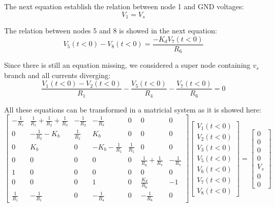 \noindent The next equation establish the relation between node 1 and GND voltages:
\begin{equation}
V_1 = V_s
  \label{eq:kvl_node1}
\end{equation}

\noindent The relation between nodes 5 and 8 is showed in the next equation:
\begin{equation}
V_5(t<0) - V_8(t<0) = \frac{-K_dV_7(t<0)}{R_6}
  \label{eq:kvl_node58}
\end{equation}

\noindent Since there is still an equation missing, we considered a super node containing $v_s$ branch and all currents diverging:
\begin{equation}
\frac{V_1(t<0) - V_2(t<0)}{R_1} - \frac{V_5(t<0)}{R_4} - \frac{V_7(t<0)}{R_6} = 0
  \label{eq:kvl_supernode}
\end{equation}

\noindent All these equations can be transformed in a matricial system as it is showed here:
$$ \left[ \begin{array}{ccccccc} -\frac{1}{R_1} & \frac{1}{R_1} + \frac{1}{R_2} + \frac{1}{R_3} & -\frac{1}{R_2} & -\frac{1}{R_3} & 0 & 0 & 0 \\
0 & -\frac{1}{R_2} - K_b & \frac{1}{R_2} & K_b & 0 & 0 & 0 \\
0 & K_b & 0 & -K_b -\frac{1}{R_5}& \frac{1}{R_5} & 0 & 0
\\ 0 & 0 & 0 & 0 & 0 & \frac{1}{R_6} + \frac{1}{R_7} & -\frac{1}{R_7}
\\ 1 & 0 & 0 & 0 & 0 & 0 & 0
\\ 0 & 0 & 0 & 1 & 0 & \frac{K_d}{R_6} & -1
\\ \frac{1}{R_1} & -\frac{1}{R_1} & 0 & -\frac{1}{R_4} & 0 & -\frac{1}{R_6} & 0\end{array} \right]
\left[ \begin{array}{c} V_1(t<0) \\ V_2(t<0) \\ V_3(t<0) \\ V_5(t<0) \\ V_6(t<0) \\ V_7(t<0) \\ V_8(t<0)\end{array} \right] = 
\left[ \begin{array}{c} 0 \\ 0 \\ 0 \\ 0 \\ V_s \\ 0 \\ 0\end{array} \right] $$

